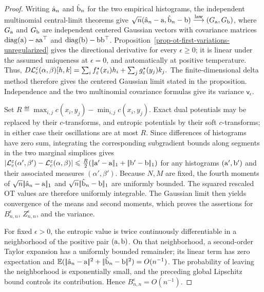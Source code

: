 \begin{proof}
Writing \(\hat{\mathrm{a}}_n\) and \(\hat{\mathrm{b}}_n\) for the two empirical histograms, the independent multinomial central-limit theorems give \(\sqrt n(\hat{\mathrm{a}}_n-\mathrm{a},\hat{\mathrm{b}}_n-\mathrm{b})\overset{\mathrm{law}}{\longrightarrow}(G_{\mathrm{a}},G_{\mathrm{b}})\), where \(G_{\mathrm{a}}\) and \(G_{\mathrm{b}}\) are independent centered Gaussian vectors with covariance matrices \(\operatorname{diag}(\mathrm{a})-\mathrm{a}\mathrm{a}^\top\) and \(\operatorname{diag}(\mathrm{b})-\mathrm{b}\mathrm{b}^\top\). Proposition~\ref{prop-ot-first-variations-unregularized} gives the directional derivative for every \(\epsilon\geq0\); it is linear under the assumed uniqueness at \(\epsilon=0\), and automatically at positive temperature. Thus,
\(D\mathcal{L}_c^\varepsilon(\alpha,\beta)[h,k] = \sum_i f_\varepsilon^\star(x_i)h_i + \sum_j g_\varepsilon^\star(y_j)k_j.\)
The finite-dimensional delta method therefore gives the centered Gaussian limit stated in the proposition. Independence and the two multinomial covariance formulas give its variance \(\mathsf{v}_\epsilon\).

Set \(R\eqdef\max_{i,j}c(x_i,y_j)-\min_{i,j}c(x_i,y_j)\). Exact dual potentials may be replaced by their \(c\)-transforms, and entropic potentials by their soft \(c\)-transforms; in either case their oscillations are at most \(R\). Since differences of histograms have zero sum, integrating the corresponding subgradient bounds along segments in the two marginal simplices gives \(\left\lvert\mathcal{L}_c^\varepsilon(\alpha',\beta')-\mathcal{L}_c^\varepsilon(\alpha,\beta)\right\rvert\leqslant\frac{R}{2}(|\!| \mathrm{a}'-\mathrm{a} |\!|_1+|\!| \mathrm{b}'-\mathrm{b} |\!|_1)\) for any histograms \((\mathrm{a}',\mathrm{b}')\) and their associated measures \((\alpha',\beta')\). Because \(N,M\) are fixed, the fourth moments of \(\sqrt n|\!| \hat{\mathrm{a}}_n-\mathrm{a} |\!|_1\) and \(\sqrt n|\!| \hat{\mathrm{b}}_n-\mathrm{b} |\!|_1\) are uniformly bounded. The squared rescaled OT values are therefore uniformly integrable. The Gaussian limit then yields convergence of the means and second moments, which proves the assertions for \(B_{n,n}^\epsilon\), \(Z_{n,n}^\epsilon\), and the variance.

For fixed \(\epsilon>0\), the entropic value is twice continuously differentiable in a neighborhood of the positive pair \((\mathrm{a},\mathrm{b})\). On that neighborhood, a second-order Taylor expansion has a uniformly bounded remainder; its linear term has zero expectation and \(\mathbb{E}(|\!| \hat{\mathrm{a}}_n-\mathrm{a} |\!|^2+|\!| \hat{\mathrm{b}}_n-\mathrm{b} |\!|^2)=O(n^{-1})\). The probability of leaving the neighborhood is exponentially small, and the preceding global Lipschitz bound controls its contribution. Hence \(B_{n,n}^\epsilon=O(n^{-1})\).
\end{proof}
